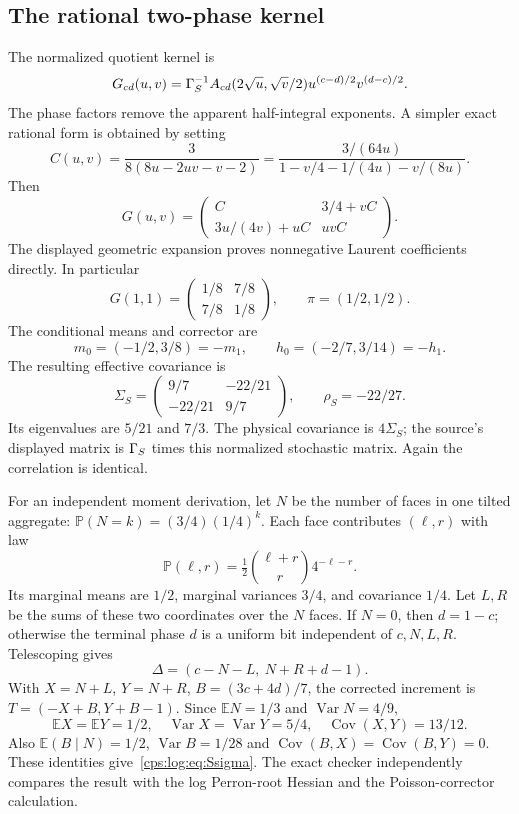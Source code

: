 \documentclass[11pt,letterpaper]{article}
\numberwithin{equation}{section}
\theoremstyle{remark}\newtheorem{remark}[theorem]{Remark}
\newcommand{\PP}{\mathbb P}
\newcommand{\EE}{\mathbb E}
\newcommand{\Cov}{\operatorname{Cov}}
\newcommand{\Var}{\operatorname{Var}}
\begin{document}
\subsection{The rational two-phase kernel}
The normalized quotient kernel is
\begin{equation}\label{cps:log:eq:Gtransform}
 G_{cd}(u,v)=\Gamma_S^{-1}A_{cd}(2\sqrt u,\sqrt v/2)
                u^{(c-d)/2}v^{(d-c)/2}.
\end{equation}
The phase factors remove the apparent half-integral exponents. A
simpler exact rational form is obtained by setting
\[
 C(u,v)=\frac3{8(8u-2uv-v-2)}
       =\frac{3/(64u)}{1-v/4-1/(4u)-v/(8u)}.
\]
Then
\begin{equation}\label{cps:log:eq:Gkernel}
 G(u,v)=\begin{pmatrix}
 C&3/4+vC\\
 3u/(4v)+uC&uvC
 \end{pmatrix}.
\end{equation}
The displayed geometric expansion proves nonnegative Laurent
coefficients directly. In particular
\[
 G(1,1)=\begin{pmatrix}1/8&7/8\\7/8&1/8\end{pmatrix},\qquad
 \pi=(1/2,1/2).
\]
The conditional means and corrector are
\[
 m_0=(-1/2,3/8)=-m_1,\qquad
 h_0=(-2/7,3/14)=-h_1.
\]
The resulting effective covariance is
\begin{equation}\label{cps:log:eq:Ssigma}
 \Sigma_S=\begin{pmatrix}9/7&-22/21\\-22/21&9/7\end{pmatrix},
 \qquad\rho_S=-22/27.
\end{equation}
Its eigenvalues are $5/21$ and $7/3$. The physical covariance is
$4\Sigma_S$; the source's displayed matrix is $\Gamma_S$ times this
normalized stochastic matrix. Again the correlation is identical.

For an independent moment derivation, let $N$ be the number of faces
in one tilted aggregate:
$\PP(N=k)=(3/4)(1/4)^k$. Each face contributes $(\ell,r)$ with law
\[
 \PP(\ell,r)=\tfrac12\binom{\ell+r}{r}4^{-\ell-r}.
\]
Its marginal means are $1/2$, marginal variances $3/4$, and covariance
$1/4$. Let $L,R$ be the sums of these two coordinates over the $N$
faces. If $N=0$, then $d=1-c$; otherwise the terminal phase $d$ is a
uniform bit independent of $c,N,L,R$. Telescoping gives
\[
 \Delta=(c-N-L,\ N+R+d-1).
\]
With $X=N+L$, $Y=N+R$, $B=(3c+4d)/7$, the corrected increment is
$T=(-X+B,Y+B-1)$. Since $\EE N=1/3$ and $\Var N=4/9$,
\[
 \EE X=\EE Y=1/2,\quad \Var X=\Var Y=5/4,\quad\Cov(X,Y)=13/12.
\]
Also $\EE(B\mid N)=1/2$, $\Var B=1/28$ and
$\Cov(B,X)=\Cov(B,Y)=0$. These identities give~\eqref{cps:log:eq:Ssigma}.
The exact checker independently compares the result with the log
Perron-root Hessian and the Poisson-corrector calculation.
\end{document}
